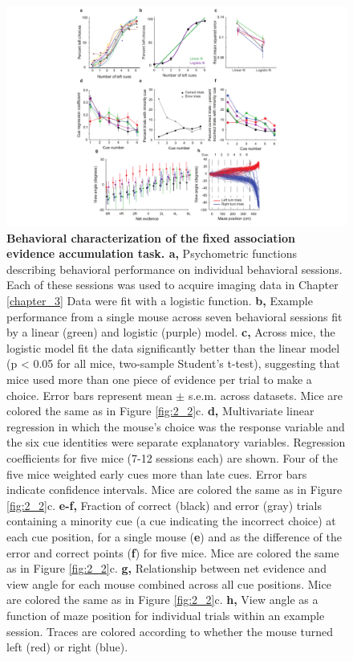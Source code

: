 \begin{figure}
\includegraphics[width=1.5\textwidth,center]{figures/fig_2_4.pdf}
\caption[Behavioral characterization of the fixed association evidence accumulation task.]{
\textbf{Behavioral characterization of the fixed association evidence accumulation task. a,} Psychometric functions describing behavioral performance on individual behavioral sessions. Each of these sessions was used to acquire imaging data in Chapter \ref{chapter_3} Data were fit with a logistic function. 
%
\textbf{b,} Example performance from a single mouse across seven behavioral sessions fit by a linear (green) and logistic (purple) model. 
%
\textbf{c,} Across mice, the logistic model fit the data significantly better than the linear model (p < 0.05 for all mice, two-sample Student's t-test), suggesting that mice used more than one piece of evidence per trial to make a choice. Error bars represent mean $\pm$ s.e.m. across datasets. Mice are colored the same as in Figure \ref{fig:2_2}c.
%
\textbf{d,} Multivariate linear regression in which the mouse's choice was the response variable and the six cue identities were separate explanatory variables. Regression coefficients for five mice (7-12 sessions each) are shown. Four of the five mice weighted early cues more than late cues. Error bars indicate confidence intervals. Mice are colored the same as in Figure \ref{fig:2_2}c.
%
\textbf{e-f,} Fraction of correct (black) and error (gray) trials containing a minority cue (a cue indicating the incorrect choice) at each cue position, for a single mouse (\textbf{e}) and as the difference of the error and correct points (\textbf{f}) for five mice. Mice are colored the same as in Figure \ref{fig:2_2}c. 
%
\textbf{g,} Relationship between net evidence and view angle for each mouse combined across all cue positions. Mice are colored the same as in Figure \ref{fig:2_2}c.
%
\textbf{h,} View angle as a function of maze position for individual trials within an example session. Traces are colored according to whether the mouse turned left (red) or right (blue).
\label{fig:2_4}}
\end{figure}



